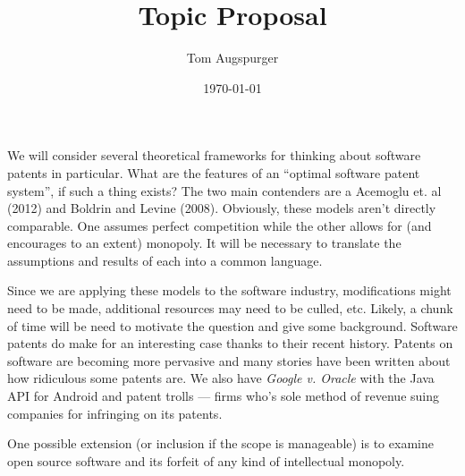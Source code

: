 \documentclass[11pt]{article}
\title{Topic Proposal}
\author{Tom Augspurger}
\date{\today}
\begin{document}
\maketitle

We will consider several theoretical frameworks for thinking about software patents in particular.  What are the features of an ``optimal software patent system'', if such a thing exists? The two main contenders are a Acemoglu et. al (2012) and Boldrin and Levine (2008).  Obviously, these models aren't directly comparable.  One assumes perfect competition while the other allows for (and encourages to an extent) monopoly. It will be necessary to translate the assumptions and results of each into a common language.  

Since we are applying these models to the software industry, modifications might need to be made, additional resources may need to be culled, etc.  Likely, a chunk of time will be need to motivate the question and give some background.  Software patents do make for an interesting case thanks to their recent history.  Patents on software are becoming more pervasive and many stories have been written about how ridiculous some patents are.  We also have \emph{Google v. Oracle} with the Java API for Android and patent trolls --- firms who's sole method of revenue suing companies for infringing on its patents.

One possible extension (or inclusion if the scope is manageable) is to examine open source software and its forfeit of any kind of intellectual monopoly.
\end{document}

